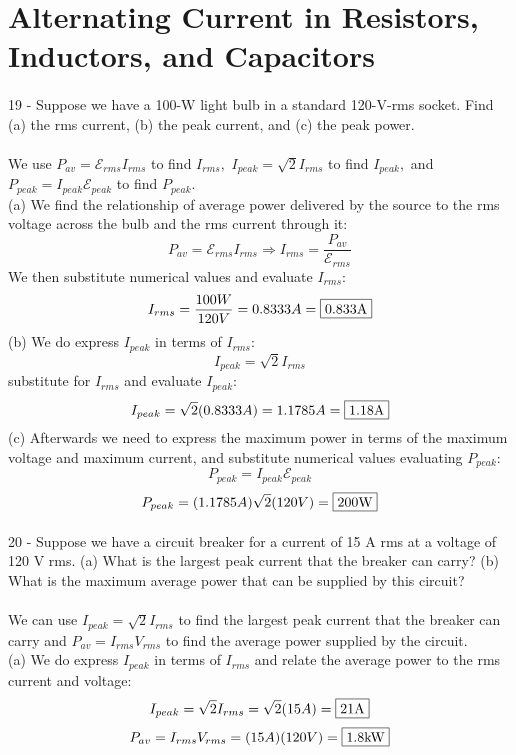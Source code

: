 \documentclass{report}
\begin{document}
\section{Alternating Current in Resistors, Inductors, and Capacitors}
\paragraph{}
19 - Suppose we have a 100-W light bulb in a standard 120-V-rms socket. Find (a) the rms current, (b) the peak current, and (c) the peak power.\\
\\
We use $P_{av} = \mathcal{E}_{rms}I_{rms}$ to find $I_{rms},$ $I_{peak} = \sqrt{2}I_{rms}$ to find $I_{peak},$ and $P_{peak} = I_{peak} \mathcal{E}_{peak}$ to find $P_{peak}.$\\
(a) We find the relationship of average power delivered by the source to the rms
voltage across the bulb and the rms current through it:
$$P_{av} = \mathcal{E}_{rms}I_{rms} \Rightarrow I_{rms} = \frac{P_{av}}{\mathcal{E}_{rms}}$$
We then substitute numerical values and evaluate $I_{rms}:$
$$I_{rms} = \frac{100W}{120V} = 0.8333A = \fbox{0.833A}$$
(b) We do express $I_{peak}$ in terms of $I_{rms}:$
$$I_{peak} = \sqrt{2}I_{rms}$$
substitute for $I_{rms}$ and evaluate $I_{peak}:$
$$I_{peak} = \sqrt{2}(0.8333A) = 1.1785A = \fbox{1.18A}$$
(c) Afterwards we need to express the maximum power in terms of the maximum voltage and maximum current, and substitute numerical values evaluating $P_{peak}:$
$$P_{peak} = I_{peak} \mathcal{E}_{peak}$$
$$P_{peak} = (1.1785A)\sqrt{2}(120V) = \fbox{200W}$$

\paragraph{}
20 - Suppose we have a circuit breaker for a current of 15 A rms at a voltage of 120 V rms. (a) What is the largest peak current that the breaker can carry? (b) What is the maximum average power that can be supplied by this circuit?\\
\\
We can use $I_{peak} = \sqrt{2}I_{rms}$ to find the largest peak current that the breaker can carry and $P_{av} = I_{rms}V_{rms}$ to find the average power supplied by the circuit.\\
(a) We do express $I_{peak}$ in terms of $I_{rms}$ and relate the average power to the rms current and voltage:
$$I_{peak} = \sqrt{2}I_{rms} = \sqrt{2}(15A) = \fbox{21A}$$
$$P_{av} = I_{rms}V_{rms} = (15A)(120V) = \fbox{1.8kW}$$
\end{document}
